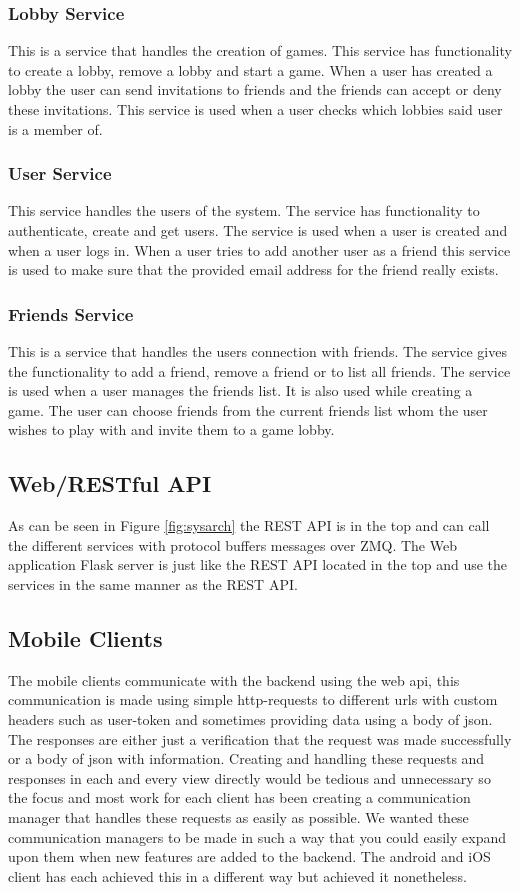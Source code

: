 \subsubsection{Lobby Service}
This is a service that handles the creation of games. This service has functionality to create a lobby, remove a lobby and start a game. When a user has created a lobby the user can send invitations to friends and the friends can accept or deny these invitations. This service is used when a user checks which lobbies said user is a member of. 

\subsubsection{User Service}
This service handles the users of the system. The service has functionality to authenticate, create and get users. The service is used when a user is created and when a user logs in. When a user tries to add another user as a friend this service is used to make sure that the provided email address for the friend really exists. 

\subsubsection{Friends Service}
This is a service that handles the users connection with friends. The service gives the functionality to add a friend, remove a friend or to list all friends. The service is used when a user manages the friends list. It is also used while creating a game. The user can choose friends from the current friends list whom the user wishes to play with and invite them to a game lobby.

\subsection{Web/RESTful API}
As can be seen in Figure \ref{fig:sysarch} the REST API is in the top and can call the different services with protocol buffers messages over ZMQ. The Web application Flask server is just like the REST API located in the top and use the services in the same manner as the REST API.

\subsection{Mobile Clients}
The mobile clients communicate with the backend using the web api, this communication is made using simple http-requests to different urls with custom headers such as user-token and sometimes providing data using a body of json. The responses are either just a verification that the request was made successfully or a body of json with information. Creating and handling these requests and responses in each and every view directly would be tedious and unnecessary so the focus and most work for each client has been creating a communication manager that handles these requests as easily as possible. We wanted these communication managers to be made in such a way that you could easily expand upon them when new features are added to the backend. The android and iOS client has each achieved this in a different way but achieved it nonetheless. 